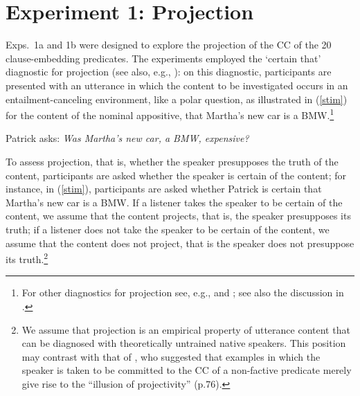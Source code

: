 \documentclass[11pt,fleqn]{article}
\newcommand{\6}{\mbox{$[\hspace*{-.6mm}[$}}
\newcommand{\9}{\mbox{$]\hspace*{-.6mm}]$}}
\begin{document}
%
%
%
%


\section{Experiment 1: Projection}\label{s2}

Exps.~1a and 1b were designed to explore the projection of the CC of the 20 clause-embedding predicates. The experiments employed the `certain that' diagnostic for projection (see also, e.g., \citealt{tonhauser-salt26,djaerv-bacovcin-salt27,stevens-etal2017,tbd-variability,mahler-nels,demarneffe-etal-sub23}): on this diagnostic, participants are presented with an utterance in which the content to be investigated occurs in an entailment-canceling environment, like a polar question, as illustrated in (\ref{stim}) for the content of the nominal appositive, that Martha's new car is a BMW.\footnote{For other diagnostics for projection see, e.g., \citealt{smith-hall11,xue-onea11} and \citealt{brst-lang11}; see also the discussion in \citealt{tbd-variability}.} 

\begin{exe}

\ex\label{stim} Patrick asks: {\em Was Martha's new car, a BMW, expensive?} 

\end{exe}
To assess projection, that is, whether the speaker presupposes the truth of the content, participants are asked whether the speaker is certain of the content; for instance, in (\ref{stim}), participants are asked whether Patrick is certain that Martha's new car is a BMW. If a listener takes the speaker to be certain of the content, we assume that the content projects, that is, the speaker presupposes its truth; if a listener does not take the speaker to be certain of the content, we assume that the content does not project, that is the speaker does not presuppose its truth.\footnote{We assume that projection is an empirical property of utterance content that can be diagnosed with theoretically untrained native speakers. This position may contrast with that of \citet{anand-hacquard2014}, who suggested that examples in which the speaker is taken to be committed to the CC of a non-factive predicate merely give rise to the ``illusion of projectivity'' (p.76).} 
\end{document}
